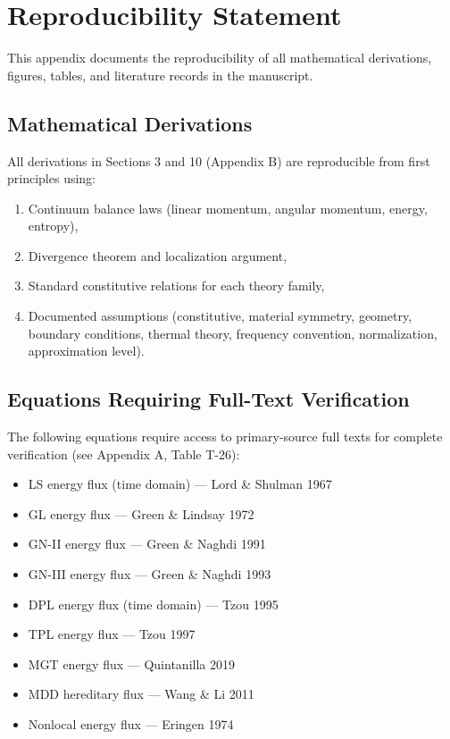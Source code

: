 \section{Reproducibility Statement}
\label{app:reproducibility}

This appendix documents the reproducibility of all mathematical derivations, figures, tables, and literature records in the manuscript.

\subsection{Mathematical Derivations}

All derivations in Sections 3 and 10 (Appendix B) are reproducible from first principles using:

\begin{enumerate}
\item Continuum balance laws (linear momentum, angular momentum, energy, entropy),
\item Divergence theorem and localization argument,
\item Standard constitutive relations for each theory family,
\item Documented assumptions (constitutive, material symmetry, geometry, boundary conditions, thermal theory, frequency convention, normalization, approximation level).
\end{enumerate}

\subsection{Equations Requiring Full-Text Verification}

The following equations require access to primary-source full texts for complete verification (see Appendix A, Table T-26):

\begin{itemize}
\item LS energy flux (time domain) — Lord \& Shulman 1967
\item GL energy flux — Green \& Lindsay 1972
\item GN-II energy flux — Green \& Naghdi 1991
\item GN-III energy flux — Green \& Naghdi 1993
\item DPL energy flux (time domain) — Tzou 1995
\item TPL energy flux — Tzou 1997
\item MGT energy flux — Quintanilla 2019
\item MDD hereditary flux — Wang \& Li 2011
\item Nonlocal energy flux — Eringen 1974
\end{itemize}


